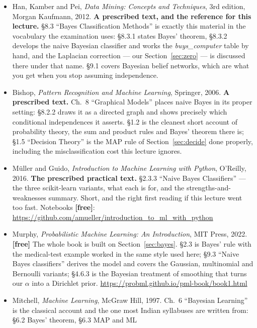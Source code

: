 \documentclass[11pt]{article}
\begin{document}
\begin{itemize}[leftmargin=*]
  \item Han, Kamber and Pei, \emph{Data Mining: Concepts and Techniques}, 3rd
    edition, Morgan Kaufmann, 2012. \textbf{A prescribed text, and the
    reference for this lecture.} \S8.3 ``Bayes Classification Methods'' is
    exactly this material in the vocabulary the examination uses: \S8.3.1
    states Bayes' theorem, \S8.3.2 develops the naive Bayesian classifier and
    works the \emph{buys\_computer} table by hand, and the Laplacian
    correction --- our Section~\ref{sec:zero} --- is discussed there under
    that name. \S9.1 covers Bayesian belief networks, which are what you get
    when you stop assuming independence.
  \item Bishop, \emph{Pattern Recognition and Machine Learning}, Springer,
    2006. \textbf{A prescribed text.} Ch.~8 ``Graphical Models'' places naive
    Bayes in its proper setting: \S8.2.2 draws it as a directed graph and
    shows precisely which conditional independences it asserts. \S1.2 is the
    cleanest short account of probability theory, the sum and product rules
    and Bayes' theorem there is; \S1.5 ``Decision Theory'' is the MAP rule of
    Section~\ref{sec:decide} done properly, including the misclassification
    cost this lecture ignores.
  \item M\"uller and Guido, \emph{Introduction to Machine Learning with
    Python}, O'Reilly, 2016. \textbf{The prescribed practical text.}
    \S2.3.3 ``Naive Bayes Classifiers'' --- the three scikit-learn variants,
    what each is for, and the strengths-and-weaknesses summary. Short, and
    the right first reading if this lecture went too fast. Notebooks
    \textbf{[free]}:
    \url{https://github.com/amueller/introduction_to_ml_with_python}
  \item Murphy, \emph{Probabilistic Machine Learning: An Introduction}, MIT
    Press, 2022. \textbf{[free]} The whole book is built on
    Section~\ref{sec:bayes}. \S2.3 is Bayes' rule with the medical-test
    example worked in the same style used here; \S9.3 ``Naive Bayes
    classifiers'' derives the model and covers the Gaussian, multinomial and
    Bernoulli variants; \S4.6.3 is the Bayesian treatment of smoothing that
    turns our $\alpha$ into a Dirichlet prior.
    \url{https://probml.github.io/pml-book/book1.html}
  \item Mitchell, \emph{Machine Learning}, McGraw Hill, 1997. Ch.~6
    ``Bayesian Learning'' is the classical account and the one most Indian
    syllabuses are written from: \S6.2 Bayes' theorem, \S6.3 MAP and ML

\end{itemize}
\end{document}
